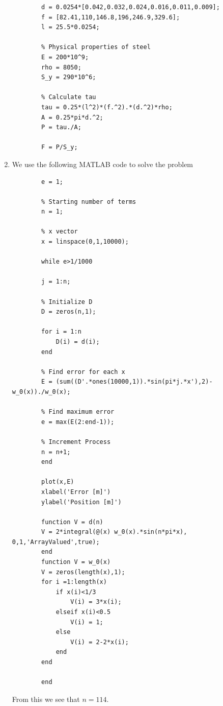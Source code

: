 \documentclass{article}
\begin{document}
\begin{enumerate}
        \begin{lstlisting}[style=Matlab-editor]
        % Given in problem
        d = 0.0254*[0.042,0.032,0.024,0.016,0.011,0.009];
        f = [82.41,110,146.8,196,246.9,329.6];
        l = 25.5*0.0254;
        
        % Physical properties of steel
        E = 200*10^9;
        rho = 8050;
        S_y = 290*10^6;
        
        % Calculate tau
        tau = 0.25*(l^2)*(f.^2).*(d.^2)*rho;
        A = 0.25*pi*d.^2;
        P = tau./A;
        
        F = P/S_y;  

        \end{lstlisting}

    \item 
    We use the following MATLAB code to solve the problem
        \begin{lstlisting}[style=Matlab-editor]
        % Initialize error
        e = 1;
        
        % Starting number of terms
        n = 1;
        
        % x vector
        x = linspace(0,1,10000);
        
        while e>1/1000
        
        j = 1:n;
        
        % Initialize D
        D = zeros(n,1);
        
        for i = 1:n
            D(i) = d(i);
        end
        
        % Find error for each x
        E = (sum((D'.*ones(10000,1)).*sin(pi*j.*x'),2)-w_0(x))./w_0(x);
        
        % Find maximum error
        e = max(E(2:end-1));
        
        % Increment Process
        n = n+1;
        end
        
        plot(x,E)
        xlabel('Error [m]')
        ylabel('Position [m]')
        
        function V = d(n)
        V = 2*integral(@(x) w_0(x).*sin(n*pi*x), 0,1,'ArrayValued',true);
        end
        function V = w_0(x)
        V = zeros(length(x),1);
        for i =1:length(x)
            if x(i)<1/3
                V(i) = 3*x(i);
            elseif x(i)<0.5
                V(i) = 1;
            else
                V(i) = 2-2*x(i);
            end
        end
        
        end
        \end{lstlisting}
    From this we see that $n=114$.
    

\end{enumerate}
\end{document}
